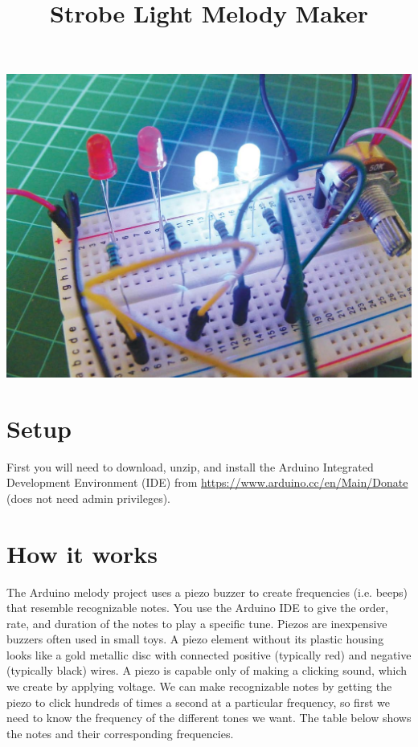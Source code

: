 \documentclass[11pt]{article}
\date{}
\title{Strobe Light Melody Maker}
\begin{document}
\maketitle
\includegraphics[width=.9\linewidth]{./arduino-images-044.png}

\section{Setup}
\label{sec-1}

First you will need to download, unzip, and install the Arduino Integrated Development Environment (IDE) from
\url{https://www.arduino.cc/en/Main/Donate} (does not need admin privileges).

\section{How it works}
\label{sec-2}

The Arduino melody project uses a piezo buzzer to create frequencies (i.e. beeps) that resemble recognizable notes. You
use the Arduino IDE to give the order, rate, and duration of the notes to play a specific tune.  Piezos are inexpensive
buzzers often used in small toys. A piezo element without its plastic housing looks like a gold metallic disc with
connected positive (typically red) and negative (typically black) wires.  A piezo is capable only of making a clicking
sound, which we create by applying voltage. We can make recognizable notes by getting the piezo to click hundreds of
times a second at a particular frequency, so first we need to know the frequency of the different tones we want. The
table below shows the notes and their corresponding frequencies.
\end{document}
